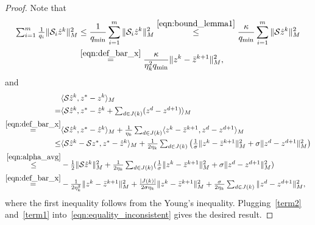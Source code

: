 \begin{proof}
Note that
\begin{equation}\label{term2}
\begin{aligned}
\textstyle\sum_{i=1}^m\frac{1}{q_i} \|\cS_i\hat{z}^{k}\|_M^2&\le\frac{1}{q_{\min}}
\sum_{i=1}^m\|\cS_i\hat{z}^{k}\|_M^2\overset{\eqref{eqn:bound_lemma1}}{\leq}
\frac{\kappa}{q_{\min}} \sum_{i=1}^m\|\cS\hat{z}^{k}\|^2_M\\
&\overset{\eqref{eqn:def_bar_x}}{=}\frac{\kappa}{\eta_k^2q_{\min}}\|z^k-\bar{z}^{k+1}\|_M^2,
\end{aligned}
\end{equation}
and
\begin{equation}\label{term1}
\begin{aligned}
&\langle \cS \hat{z}^{k}, z^* - z^k \rangle_M\\
=&\textstyle\langle \cS \hat{z}^{k},z^* - \hat{z}^k + \sum_{d\in J(k)} (z^{d} -
z^{d+1})\rangle_M\cr \overset{\eqref{eqn:def_bar_x}}=&\textstyle\langle \cS
\hat{z}^{k}, z^* - \hat{z}^k\rangle_M + \frac{1}{\eta_k}\sum_{d\in J(k)}\langle
z^k-\bar{z}^{k+1}, z^{d} - z^{d+1}\rangle_M\cr \le&\textstyle \langle \cS
\hat{z}^{k}-\cS z^*, z^* - \hat{z}^k\rangle_M+\frac{1}{2\eta_k}\sum_{d\in
J(k)}\big(\frac{1}{\sigma}\|z^k-\bar{z}^{k+1}\|_M^2+ \sigma\|z^{d} -
z^{d+1}\|_M^2\big)\cr \overset{\eqref{eqn:alpha_avg}}\le&\textstyle
-\frac{1}{2}\|\cS \hat{z}^{k}\|_M^2+\frac{1}{2\eta_k}\sum_{d\in
J(k)}(\frac{1}{\sigma}\|z^k-\bar{z}^{k+1}\|_M^2+ \sigma\|z^{d} -
z^{d+1}\|_M^2)\cr
\overset{\eqref{eqn:def_bar_x}}=&\textstyle-\frac{1}{2\eta_k^2}\|z^k-\bar{z}^{k+1}\|_M^2+
\frac{|J(k)|}{2\sigma\eta_k}\|z^k-\bar{z}^{k+1}\|_M^2+\frac{\sigma}{2\eta_k}\sum_{d\in
J(k)}\|z^{d} - z^{d+1}\|_M^2,
\end{aligned}
\end{equation}
where the first inequality follows from the Young's inequality. Plugging~\eqref{term2} and~\eqref{term1} into~\eqref{eqn:equality_inconsistent} gives the desired result.\hfill\end{proof}

